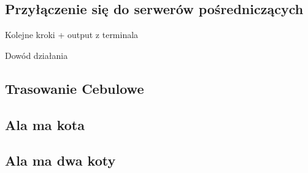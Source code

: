 \subsection{Przyłączenie się do serwerów pośredniczących}
\begin{description}
 \item Kolejne kroki + output z terminala
 \item Dowód działania
\end{description}

\subsection{Trasowanie Cebulowe}

\subsection{Ala ma kota}

\subsection{Ala ma dwa koty}

